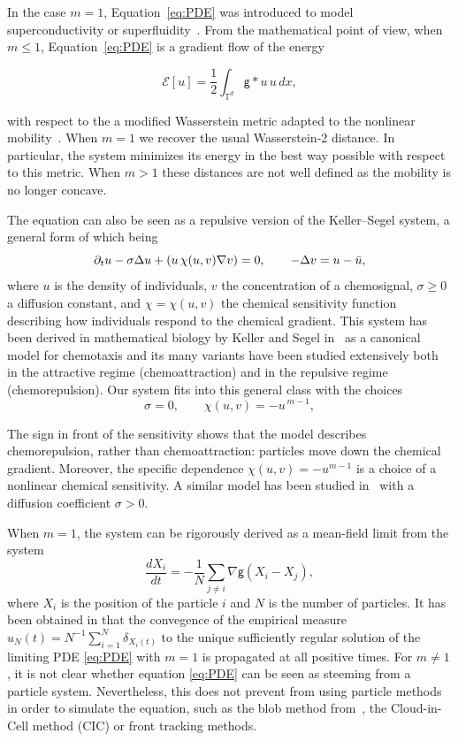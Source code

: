 \documentclass[11pt]{article}
\numberwithin{equation}{section} %
\newcommand{\T}{{\mathbb{T}}}
\newcommand{\g}{{\mathsf{g}}}
\let\div\relax
\DeclareMathOperator{\div}{\mathsf{div}}
\begin{document}
In the case $m=1$, Equation~\eqref{eq:PDE} was introduced to model superconductivity or superfluidity~\cite{chapman1996mean, weinan1994dynamics, MR1739596}. From the mathematical point of view, when $m\le 1$, Equation~\eqref{eq:PDE} is a gradient flow of the energy 

\begin{equation}\label{eq:energy_gf}
\mathcal{E}[u]= \frac{1}{2}\int_{\T^d}  \g \ast u \, u\,     dx,
\end{equation}

with respect to the a modified Wasserstein metric adapted to the nonlinear mobility~\cite{MR2448650, CarrilloLisiniSavareSlepcev2010}. When $m=1$ we recover the usual Wasserstein-2 distance.  In particular, the system minimizes its energy in the best way possible with respect to this metric. When $m> 1$ these distances are not well defined as the mobility is no longer concave. 

The equation can also be seen as a repulsive version of the Keller--Segel system, a general form of which being  
\begin{equation}\label{eq:KS_general}
\partial_t u - \sigma \Delta u + \div(u\,\chi(u,v)\nabla v)=0, 
\qquad -\Delta v = u-\bar{u},
\end{equation}
where $u$ is the density of individuals, $v$ the concentration of a chemosignal, $\sigma \geq 0$ a diffusion constant, and $\chi=\chi(u,v)$ the chemical sensitivity function describing how individuals respond to the chemical gradient. This system has been derived in mathematical biology by Keller and Segel in~\cite{keller1971model,keller_initiation_1970} as a canonical model for chemotaxis and its many variants have been studied extensively both in the attractive regime (chemoattraction) and in the repulsive regime (chemorepulsion). Our system fits into this general class with the choices  
$$
\sigma =0, 
\qquad 
\chi(u,v)=-u^{\,m-1},
$$

The sign in front of the sensitivity shows that the model describes chemorepulsion, rather than chemoattraction: particles move down the chemical gradient. Moreover, the specific dependence $\chi(u,v)=-u^{m-1}$ is a choice of a nonlinear chemical sensitivity. A similar model has been studied in~\cite{MR3723527,MR3124759} with a diffusion coefficient $\sigma >0$. 

When $m=1$, the system can be rigorously derived as a mean-field limit from the system
$$
\frac{dX_i}{dt} = - \frac{1}{N}\sum_{j\ne i}\nabla \g (X_i - X_j),
$$
where $X_i$ is the position of the particle $i$ and $N$ is the number of particles. It has been obtained in \cite{serfaty2020mean} that the convegence of the empirical measure $u_N(t)=N^{-1}\sum_{i=1}^N \delta_{X_i(t)}$ to the unique sufficiently regular solution of the limiting PDE \eqref{eq:PDE} with $m=1$ is propagated at all positive times. For $m\ne 1$, it is not clear whether equation \eqref{eq:PDE} can be seen as steeming from a particle system. Nevertheless, this does not prevent from using particle methods in order to simulate the equation, such as the blob method from~\cite{MR3471104, MR3913840}, the Cloud-in-Cell method (CIC) or front tracking methods.
\end{document}
